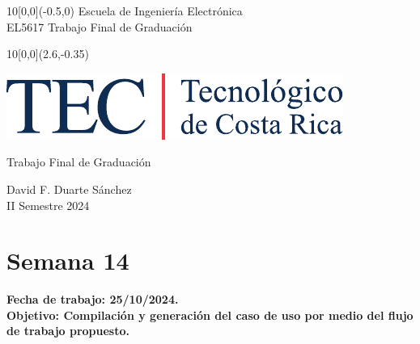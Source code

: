 \documentclass[12pt,letterpaper]{article}
\newcommand{\EstudianteA}{David F. Duarte Sánchez}
\begin{document}
	
\graphicspath{{./}{./fig/}}


%
\begin{textblock}{10}[0,0](-0.5,0)
	\large Escuela de Ingeniería Electrónica \\ 
	EL5617 Trabajo Final de Graduación \\
\end{textblock}

%
\begin{textblock}{10}[0,0](2.6,-0.35)
	\begin{flushright}
		\includegraphics[scale=0.8]{Firma_TEC-4.pdf}
	\end{flushright}
\end{textblock}

\begin{center}
	\vspace{70mm}
	{\large\color{tecRojo} Trabajo Final de Graduación}
	\par\vspace{8mm}
	{\Large\bf\color{tecAzul}{Bitácora de Trabajo - Entrega 9}}
	\par\vspace{100mm}
	{{\EstudianteA \\ II Semestre 2024} 
	\vspace{8mm}}
\end{center}

\newpage

\renewcommand{\baselinestretch}{1.1}    %


\section{Semana 14}

\bf{Fecha de trabajo:} 25/10/2024.\\
\bf{Objetivo:} Compilación y generación del caso de uso por medio del flujo de trabajo propuesto.
\end{document}
